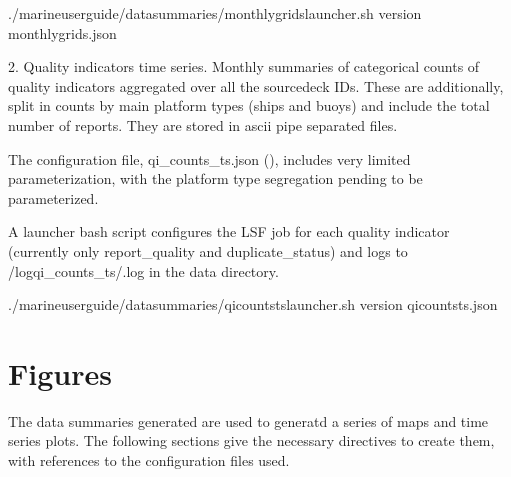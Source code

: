 \documentclass[letterpaper,10pt,english]{sphinxmanual}
\begin{document}
\begin{sphinxVerbatim}[commandchars=\\\{\}]
./marine\PYGZhy{}user\PYGZhy{}guide/data\PYGZus{}summaries/monthly\PYGZus{}grids\PYGZus{}launcher.sh version monthly\PYGZus{}grids.json
\end{sphinxVerbatim}

2. Quality indicators time series. Monthly summaries of categorical counts of
quality indicators aggregated over all the source\sphinxhyphen{}deck IDs. These are additionally,
split in counts by main platform types (ships and buoys) and include the total
number of reports. They are stored in ascii pipe separated files.

The configuration file, qi\_counts\_ts.json ({\hyperref[\detokenize{index:qi-counts-config}]{}}), includes very limited parameterization, with the platform type segregation pending to be parameterized.

A launcher bash script configures the LSF job for each quality indicator (currently only report\_quality and duplicate\_status) and logs to /logqi\_counts\_ts/.log in the data directory.

\begin{sphinxVerbatim}[commandchars=\\\{\}]
./marine\PYGZhy{}user\PYGZhy{}guide/data\PYGZus{}summaries/qi\PYGZus{}counts\PYGZus{}ts\PYGZus{}launcher.sh version qi\PYGZus{}counts\PYGZus{}ts.json
\end{sphinxVerbatim}


\chapter{Figures}
\label{\detokenize{index:figures}}
The data summaries generated are used to generatd a series of maps and time series
plots. The following sections give the necessary directives to create them, with
references to the configuration files used.
\end{document}
